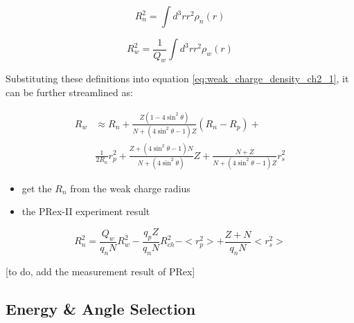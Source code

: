 \begin{equation}
R^2_n = \int d^3rr^2\rho_n(r)
\end{equation}

\begin{equation}
R^2_w = \frac{1}{Q_w}\int d^3rr^2\rho_w(r)
\end{equation}

Substituting these definitions into equation \ref{eq:weak_charge_density_ch2_1}, it can be further streamlined as:

\begin{equation}
\begin{split}
R_w & \approx R_n + \frac{Z(1-4\sin^2{\theta})}{N + (4\sin^2{\theta} -1)Z}(R_n - R_p) + \\
& \frac{1}{2R_n}{r_p^2 + \frac{Z + (4\sin^2{\theta} - 1)N}{N + (4\sin^2{\theta})}Z + \frac{N + Z}{N + (4\sin^2{\theta} -1 )Z}r_s^2}
\end{split}
\end{equation}

\begin{itemize}
    \item get the $R_n$ from the weak charge radius
    \item the PRex-II experiment result 
    
\end{itemize}



\begin{equation}
    R_n^2 = \frac{Q_w}{q_nN}R_w^2 - \frac{q_pZ}{q_nN}R_{ch}^2 - <r_p^2> + \frac{Z+N}{q_nN}<r_s^2>
\end{equation}

[to do, add the measurement result of PRex]
\subsection{Energy \& Angle Selection}





